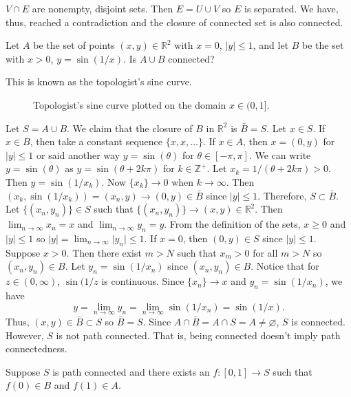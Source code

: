 \begin{exercise}[ref = \arabic{exercisei}]
  \(V\cap E\) are nonempty, disjoint sets.
  Then \(E = U\cup V\) so \(E\) is separated.
  We have, thus, reached a contradiction and the closure of connected set is
  also connected.
\item
  Let \(A\) be the set of points \((x,y)\in\mathbb{R}^2\) with \(x = 0\),
  \(\lvert y\rvert\leq 1\), and let \(B\) be the set with \(x > 0\),
  \(y = \sin(1/x)\).
  Is \(A\cup B\) connected?
  \par\smallskip
  This is known as the topologist's sine curve.
  \begin{figure}[H]
    \centering
    
    \caption{Topologist's sine curve plotted on the domain \(x\in(0,1]\).}
    \label{ch3sec13prob4}
  \end{figure}
  Let \(S = A\cup B\).
  We claim that the closure of \(B\) in \(\mathbb{R}^2\) is \(\bar{B} = S\).
  Let \(x\in S\).
  If \(x\in B\), then take a constant sequence \(\{x,x,\ldots\}\).
  If \(x\in A\), then \(x = (0,y)\) for \(\lvert y\rvert\leq 1\) or said
  another way \(y = \sin(\theta)\) for \(\theta\in[-\pi,\pi]\).
  We can write \(y = \sin(\theta)\) as \(y = \sin(\theta + 2k\pi)\) for
  \(k\in\mathbb{Z}^+\).
  Let \(x_k = 1/(\theta + 2k\pi) > 0\).
  Then \(y = \sin(1/x_k)\).
  Now \(\{x_k\}\to 0\) when \(k\to\infty\).
  Then \((x_k,\sin(1/x_k)) = (x_n,y)\to (0,y)\in\bar{B}\) since
  \(\lvert y\rvert\leq 1\).
  Therefore, \(S\subset\bar{B}\).
  Let \(\{(x_n,y_n)\}\in S\) such that \(\{(x_n,y_n)\}\to
  (x,y)\in\mathbb{R}^2\).
  Then \(\lim_{n\to\infty}x_n = x\) and \(\lim_{n\to\infty}y_n = y\).
  From the definition of the sets, \(x\geq 0\) and \(\lvert y\rvert\leq 1\) so
  \(\lvert y\rvert = \lim_{n\to\infty}\lvert y_n\rvert\leq 1\).
  If \(x = 0\), then \((0,y)\in S\) since \(\lvert y\rvert\leq 1\).
  Suppose \(x > 0\).
  Then there exist \(m > N\) such that \(x_m > 0\) for all \(m > N\) so
  \((x_n,y_n)\in B\).
  Let \(y_n = \sin(1/x_n)\) since \((x_n,y_n)\in B\).
  Notice that for \(z\in(0,\infty)\), \(\sin(1/z\) is continuous.
  Since \(\{x_n\}\to x\) and \(y_n = \sin(1/x_n)\), we have
  \[
    y = \lim_{n\to\infty}y_n = \lim_{n\to\infty}\sin(1/x_n) = \sin(1/x).
  \]
  Thus, \((x,y)\in\bar{B}\subset S\) so \(\bar{B} = S\).
  Since \(A\cap\bar{B} = A\cap S = A\neq\varnothing\), \(S\) is connected.
  However, \(S\) is not path connected.
  That is, being connected doesn't imply path connectedness.
  \par\smallskip
  Suppose \(S\) is path connected and there exists an \(f\colon [0,1]\to S\)
  such that \(f(0)\in B\) and \(f(1)\in A\).

\end{exercise}
